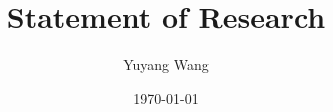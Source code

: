 



\title{Statement of Research}

\author{Yuyang Wang}
\date{\today}
\makeatletter
\fancyfoot[L]{\scshape \MakeLowercase{\@author}}
\fancyfoot[R]{{\scshape \MakeLowercase{\@title}}\quad{\LARGE\sfrac{\thepage}{\pageref*{LastPage}}}}
\makeatother



\maketitle%
\thispagestyle{fancy}


\collabCustom{}


\footnotesize


